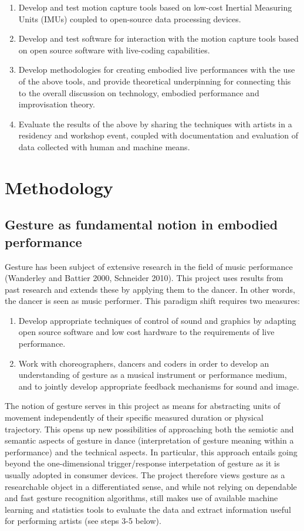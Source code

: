 \begin{enumerate}
\item Develop and test motion capture tools based on low-cost Inertial Measuring Units (IMUs) coupled to open-source data processing devices.
\item Develop and test software for interaction with the motion capture tools based on open source software with live-coding capabilities.
\item Develop methodologies for creating embodied live performances with the use of the above tools, and provide theoretical underpinning for connecting this to the overall discussion on technology, embodied performance and improvisation theory.
\item Evaluate the results of the above by sharing the techniques with artists in a residency and workshop event, coupled with documentation and evaluation of data collected with human and machine means.
\end{enumerate}

\section{Methodology}
\label{sec:org3643a80}
\subsection{Gesture as fundamental notion in embodied performance}
\label{sec:org2613de0}
Gesture has been subject of extensive research in the field of music performance (Wanderley and Battier 2000, Schneider 2010).  This project uses results from past research and extends these by applying them to the dancer.  In other words, the dancer is seen as music performer.  This paradigm shift requires two measures:

\begin{enumerate}
\item Develop appropriate techniques of control of sound and graphics by adapting open source software and low cost hardware to the requirements of live performance.
\item Work with choreographers, dancers and coders in order to develop an understanding of gesture as a musical instrument or performance medium, and to jointly develop appropriate feedback mechanisms for sound and image.
\end{enumerate}

The notion of gesture serves in this project as means for abstracting units of movement independently of their specific measured duration or physical trajectory.  This opens up new possibilities of approaching both the semiotic and semantic aspects of gesture in dance (interpretation of gesture meaning within a performance) and the technical aspects.  In particular, this approach entails going beyond the one-dimensional trigger/response interpetation of gesture as it is usually adopted in consumer devices. The project therefore views gesture as a researchable object in a differentiated sense, and while not relying on dependable and fast gesture recognition algorithms, still makes use of available machine learning and statistics tools to evaluate the data and extract information useful for performing artists (see steps 3-5 below).

